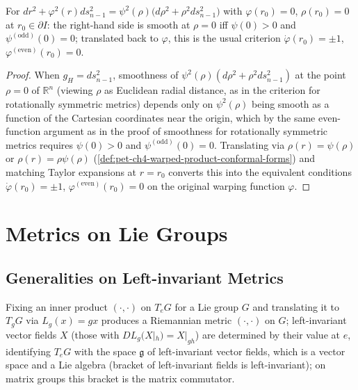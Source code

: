 \begin{proposition}
  \label{prop:pet-ch4-conformal-smoothness-criterion}
  For $dr^2+\varphi^2(r)ds_{n-1}^2=\psi^2(\rho)\big(d\rho^2+\rho^2ds_{n-1}^2\big)$
  with $\varphi(r_0)=0$, $\rho(r_0)=0$ at $r_0\in\partial I$: the right-hand side
  is smooth at $\rho=0$ iff $\psi(0)>0$ and $\psi^{(\mathrm{odd})}(0)=0$; translated
  back to $\varphi$, this is the usual criterion $\dot\varphi(r_0)=\pm1$,
  $\varphi^{(\mathrm{even})}(r_0)=0$.
\end{proposition}
\begin{proof}
  When $g_H=ds_{n-1}^2$, smoothness of $\psi^2(\rho)(d\rho^2+\rho^2ds_{n-1}^2)$
  at the point $\rho=0$ of $\mathbb{R}^n$ (viewing $\rho$ as Euclidean radial distance,
  as in the criterion for rotationally symmetric metrics) depends only on
  $\psi^2(\rho)$ being smooth as a function of the Cartesian coordinates near
  the origin, which by the same even-function argument as in the proof of
  smoothness for rotationally symmetric metrics requires $\psi(0)>0$ and
  $\psi^{(\mathrm{odd})}(0)=0$. Translating via $\rho(r)=\psi(\rho)$ or
  $\rho(r)=\rho\psi(\rho)$ (\cref{def:pet-ch4-warped-product-conformal-forms})
  and matching Taylor expansions at $r=r_0$ converts this into the equivalent
  conditions $\dot\varphi(r_0)=\pm1$, $\varphi^{(\mathrm{even})}(r_0)=0$ on the
  original warping function $\varphi$.
\end{proof}

\section{Metrics on Lie Groups}

\subsection{Generalities on Left-invariant Metrics}

\begin{definition}
  \label{def:pet-ch4-left-invariant-metric-lie}
  \leanok
  Fixing an inner product $(\cdot,\cdot)$ on $T_eG$ for a Lie group $G$ and
  translating it to $T_gG$ via $L_g(x)=gx$ produces a Riemannian metric $(\cdot,\cdot)$
  on $G$; left-invariant vector fields $X$ (those with $DL_g(X|_h)=X|_{gh}$)
  are determined by their value at $e$, identifying $T_eG$ with the space
  $\mathfrak g$ of left-invariant vector fields, which is a vector space and a
  Lie algebra (bracket of left-invariant fields is left-invariant); on matrix
  groups this bracket is the matrix commutator.
\end{definition}

